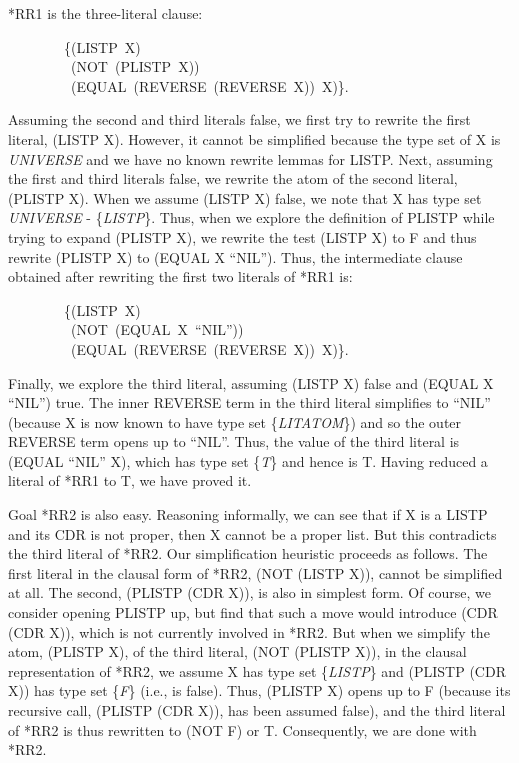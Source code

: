 \documentclass[11pt]{book}
\newenvironment{pubasis}{\begin{flushleft}\ttfamily\small}{\normalsize\rmfamily\end{flushleft}}
\newcommand{\pubinlineunderline}[1]{\emph{#1}}
\begin{document}
*RR1 is the three-literal clause:
\begin{pubasis}
~~~~~~~~\{(LISTP~X)\\
~~~~~~~~~(NOT~(PLISTP~X))\\
~~~~~~~~~(EQUAL~(REVERSE~(REVERSE~X))~X)\}.\\
\end{pubasis}
Assuming the second and third literals false, we first try to rewrite
the first literal, (LISTP X).  However, it cannot be simplified
because the type set of X is \pubinlineunderline{UNIVERSE} and we have no known rewrite lemmas
for LISTP.
Next, assuming the first and third literals false, we rewrite the atom
of the second literal, (PLISTP X).  When we assume (LISTP X)
false, we note that X has type set
\pubinlineunderline{UNIVERSE} - \{\pubinlineunderline{LISTP}\}.  Thus, when we explore the definition of PLISTP
while trying to expand (PLISTP X), we rewrite the test (LISTP X) to
F and thus rewrite (PLISTP X) to (EQUAL X ``NIL'').  Thus, the intermediate
clause obtained after rewriting the first two literals of *RR1 is:
\begin{pubasis}
~~~~~~~~\{(LISTP~X)\\
~~~~~~~~~(NOT~(EQUAL~X~``NIL''))\\
~~~~~~~~~(EQUAL~(REVERSE~(REVERSE~X))~X)\}.\\
\end{pubasis}
Finally, we explore the third literal, assuming (LISTP X) false and
(EQUAL X ``NIL'') true.  The inner REVERSE term in the third
literal
simplifies to ``NIL'' (because X is now known to have type set
\{\pubinlineunderline{LITATOM}\}) and so the outer REVERSE term opens up
to ``NIL''.  Thus, the value of the third literal is (EQUAL ``NIL'' X),
which has type set \{\pubinlineunderline{T}\} and hence is T.
Having reduced a literal of
*RR1 to T, we have proved it.

Goal *RR2 is also easy.  Reasoning informally, we can see that if X is a LISTP and its CDR
is not proper, then X cannot be a proper list.  But this contradicts the third
literal of *RR2.  Our simplification heuristic proceeds as follows.
The first literal in the clausal form of *RR2, (NOT (LISTP X)), cannot be simplified at all.  The second, (PLISTP (CDR X)), is also
in simplest form.  Of course, we consider opening PLISTP up, but find that
such a move would introduce (CDR (CDR X)), which is not currently involved
in *RR2.  But when we simplify the atom, (PLISTP X), of the third literal,
(NOT (PLISTP X)), in the clausal representation of *RR2,
we assume X has type set \{\pubinlineunderline{LISTP}\} and (PLISTP (CDR X)) has type set \{\pubinlineunderline{F}\}
(i.e., is false).  Thus, (PLISTP X) opens up to F (because
its recursive call, (PLISTP (CDR X)), has been assumed false), and
the third literal of *RR2 is thus rewritten to (NOT F) or T.
Consequently, we are done with *RR2.
\end{document}
